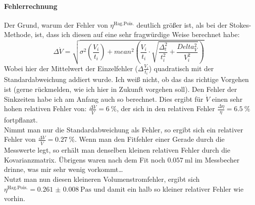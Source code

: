 \paragraph{Fehlerrechnung}
Der Grund, warum der Fehler von \(\eta^\mathrm{Hag.Pois.}\) deutlich größer ist, als bei der Stokes-Methode, ist, dass ich diesen auf eine sehr fragwürdige Weise berechnet habe:
\begin{equation}
    \Delta \dot{V}=\sqrt{\sigma^2(\frac{V_i}{t_i})+mean^2\left(\frac{V_i}{t_i}\cdot\sqrt{\frac{\Delta_t^2}{t_i^2}+\frac{Delta_V^2}{V_i^2}}\right)}
\end{equation}
Wobei hier der Mittelwert der Einzelfehler (\(\Delta \frac{V_i}{t_i}\)) quadratisch mit der Standardabweichung addiert wurde. Ich weiß nicht, ob das das richtige Vorgehen ist (gerne rückmelden, wie ich hier in Zukunft vorgehen soll). Den Fehler der Sinkzeiten habe ich am Anfang auch so berechnet. Dies ergibt für \(\dot{V}\) einen sehr hohen relativen Fehler von: \(\frac{\Delta \dot{V}}{\dot{V}}=\qty{6}{\percent}\), der sich in den relativen Fehler \(\frac{\Delta \eta}{\eta}=\qty{6.5}{\percent}\) fortpflanzt.\\
Nimmt man nur die Standardabweichung als Fehler, so ergibt sich ein relativer Fehler von \(\frac{\Delta \dot{V}}{\dot{V}}=\qty{0.27}{\percent}\). Wenn man den Fitfehler einer Gerade durch die Messwerte legt, so erhält man denselben kleinen relativen Fehler durch die Kovarianzmatrix. Übrigens waren nach dem Fit noch \(\qty{0.057}{\milli\litre}\) im Messbecher drinne, was mir sehr wenig vorkommt\dots\\
Nutzt man nun diesen kleineren Volumenstromfehler, ergibt sich \(\eta^\mathrm{Hag.Pois.}=\qty{0.261(8)}{\pascal\s}\) und damit ein halb so kleiner relativer Fehler wie vorhin.
